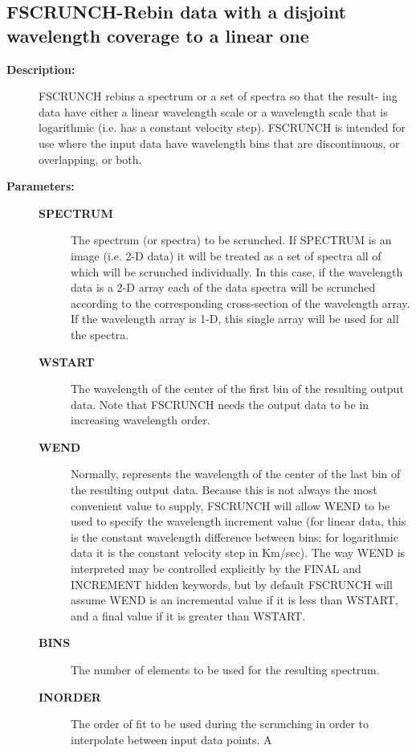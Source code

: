 \subsection{FSCRUNCH-\label{FSCRUNCH}Rebin data with a disjoint wavelength coverage to a linear one}
\begin{description}

\item [{\bf Description:}]
 FSCRUNCH rebins a spectrum or a set of spectra so that the result-
 ing data have either a linear wavelength scale or a wavelength
 scale that is logarithmic (i.e. has a constant velocity step).
 FSCRUNCH is intended for use where the input data have wavelength
 bins that are discontinuous, or overlapping, or both.

\item [{\bf Parameters:}]
\begin{description}
\item [{\bf SPECTRUM}]
 The spectrum (or spectra) to be scrunched.
 If SPECTRUM is an image (i.e. 2-D data) it will be treated
 as a set of spectra all of which will be scrunched
 individually.  In this case, if the wavelength data is
 a 2-D array each of the data spectra will be scrunched
 according to the corresponding cross-section of the
 wavelength array.  If the wavelength array is 1-D, this
 single array will be used for all the spectra.
\item [{\bf WSTART}]
 The wavelength of the center of the first bin
 of the resulting output data.  Note that FSCRUNCH needs
 the output data to be in increasing wavelength order.
\item [{\bf WEND}]
 Normally, represents the wavelength of the center of
 the last bin of the resulting output data.  Because this
 is not always the most convenient value to supply, FSCRUNCH
 will allow WEND to be used to specify the wavelength
 increment value (for linear data, this is the constant
 wavelength difference between bins; for logarithmic data
 it is the constant velocity step in Km/sec).  The way
 WEND is interpreted may be controlled explicitly by the
 FINAL and INCREMENT hidden keywords, but by default FSCRUNCH
 will assume WEND is an incremental value if it is less than
 WSTART, and a final value if it is greater than WSTART.
\item [{\bf BINS}]
 The number of elements to be used for the resulting spectrum.
\item [{\bf INORDER}]
 The order of fit to be used during the scrunching in
 order to interpolate between input data points.  A

\end{description}
\end{description}
